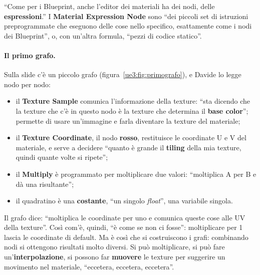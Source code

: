 ``Come per i Blueprint, anche l'editor dei materiali ha dei nodi, delle
\textbf{espressioni}.'' I \textbf{Material Expression Node} sono ``dei piccoli set di
istruzioni preprogrammate che eseguono delle cose nello specifico, esattamente come i
nodi dei Blueprint'', o, con un'altra formula, ``pezzi di codice statico''.

\paragraph{Il primo grafo.} Sulla slide c'è un piccolo grafo
(figura~\ref{ue3:fig:primografo}), e Davide lo legge nodo per nodo:
\begin{itemize}
  \item il \textbf{Texture Sample} comunica l'informazione della texture: ``sta dicendo
        che la texture che c'è in questo nodo è la texture che determina il
        \textbf{base color}''; permette di usare un'immagine e farla diventare la
        texture del materiale;
  \item il \textbf{Texture Coordinate}, il nodo \textbf{rosso}, restituisce le
        coordinate U e V del materiale, e serve a decidere ``quanto è grande il
        \textbf{tiling} della mia texture, quindi quante volte si ripete'';
  \item il \textbf{Multiply} è programmato per moltiplicare due valori: ``moltiplica A
        per B e dà una risultante'';
  \item il quadratino è una \textbf{costante}, ``un singolo \emph{float}'', una variabile
        singola.
\end{itemize}
Il grafo dice: ``moltiplica le coordinate per uno e comunica queste cose alle UV della
texture''. Così com'è, quindi, ``è come se non ci fosse'': moltiplicare per 1 lascia le
coordinate di default. Ma è così che si costruiscono i grafi: combinando nodi si
ottengono risultati molto diversi. Si può moltiplicare, si può fare
un'\textbf{interpolazione}, si possono far \textbf{muovere} le texture per suggerire un
movimento nel materiale, ``eccetera, eccetera, eccetera''.

